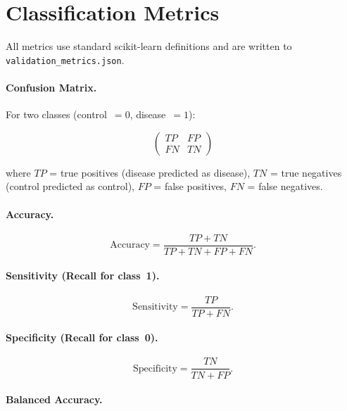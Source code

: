\documentclass[11pt]{article}
\begin{document}
\section{Classification Metrics}

All metrics use standard scikit-learn definitions and are written to
\texttt{validation\_metrics.json}.

\paragraph{Confusion Matrix.}

For two classes (control~$= 0$, disease~$= 1$):

\[
\begin{pmatrix} TP & FP \\ FN & TN \end{pmatrix}
\]

where $TP$ = true positives (disease predicted as disease), $TN$ = true
negatives (control predicted as control), $FP$ = false positives, $FN$ =
false negatives.

\paragraph{Accuracy.}

\begin{equation}
  \text{Accuracy} = \frac{TP + TN}{TP + TN + FP + FN}.
\end{equation}

\paragraph{Sensitivity (Recall for class~1).}

\begin{equation}
  \text{Sensitivity} = \frac{TP}{TP + FN}.
\end{equation}

\paragraph{Specificity (Recall for class~0).}

\begin{equation}
  \text{Specificity} = \frac{TN}{TN + FP}.
\end{equation}

\paragraph{Balanced Accuracy.}
\end{document}
